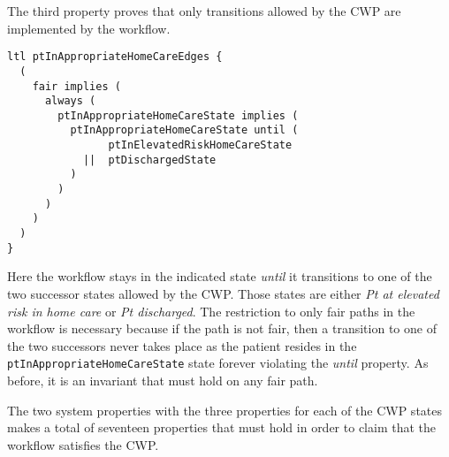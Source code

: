 The third property proves that only transitions allowed by the CWP are implemented by the workflow.
%
{\small
\begin{lstlisting}[style=myPromela]
ltl ptInAppropriateHomeCareEdges {
  (
    fair implies (
      always (
        ptInAppropriateHomeCareState implies (
          ptInAppropriateHomeCareState until (
                ptInElevatedRiskHomeCareState
            ||  ptDischargedState
          )
        )
      )
    )
  )
}
\end{lstlisting}
}
%
\noindent Here the workflow stays in the indicated state \emph{until} it transitions to one of the two successor states allowed by the CWP. Those states are either \emph{Pt at elevated risk in home care} or \emph{Pt discharged}. The restriction to only fair paths in the workflow is necessary because if the path is not fair, then a transition to one of the two successors never takes place as the patient resides in the \texttt{ptInAppropriateHomeCareState} state forever violating the \emph{until} property. As before, it is an invariant that must hold on any fair path. 

The two system properties with the three properties for each of the CWP states makes a total of seventeen properties that must hold in order to claim that the workflow satisfies the CWP.